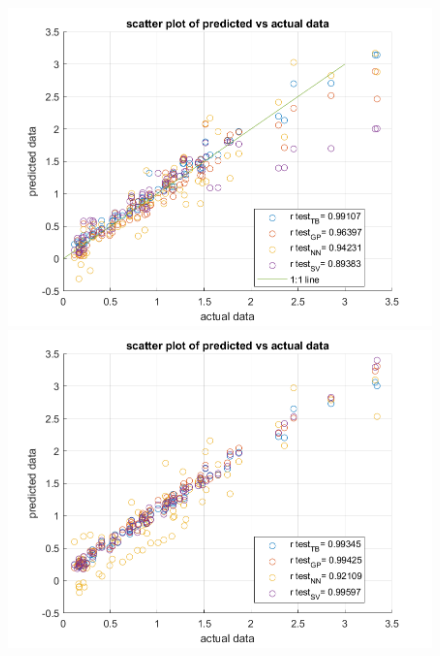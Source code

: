 \documentclass[12pt]{iopart}
\begin{document}
\begin{figure}[ht!]
\begin{center}
    \begin{minipage}{0.495\textwidth}
        \includegraphics[width=1\textwidth]{new figures/disp_wCP2500.png}
    \end{minipage}
    \begin{minipage}{0.495\textwidth}
        \includegraphics[width=1\textwidth]{new figures/disp_2500.png}
    \end{minipage}


\end{center}
\end{figure}
\end{document}
